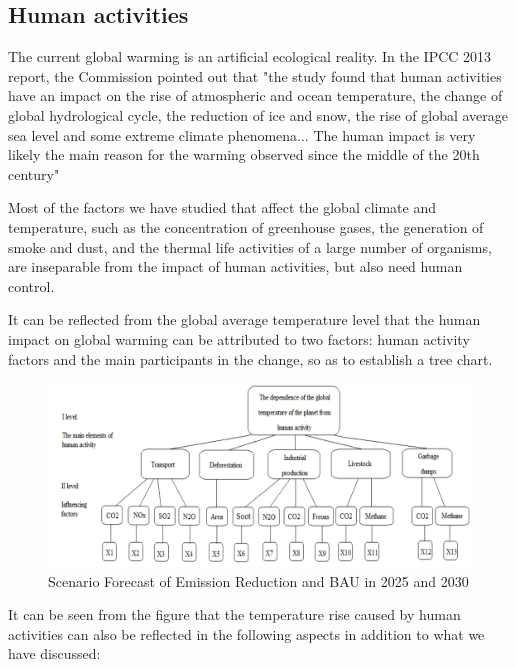 \documentclass{apmcmthesis}
\begin{document}
\subsection{Human activities}
The current global warming is an artificial ecological reality. In the IPCC 2013 report, the Commission pointed out that "the study found that human activities have an impact on the rise of atmospheric and ocean temperature, the change of global hydrological cycle, the reduction of ice and snow, the rise of global average sea level and some extreme climate phenomena... The human impact is very likely the main reason for the warming observed since the middle of the 20th century"\cite{109}

Most of the factors we have studied that affect the global climate and temperature, such as the concentration of greenhouse gases, the generation of smoke and dust, and the thermal life activities of a large number of organisms, are inseparable from the impact of human activities, but also need human control. 

It can be reflected from the global average temperature level that the human impact on global warming can be attributed to two factors: human activity factors and the main participants in the change, so as to establish a tree chart.

 \begin{figure} 
    \centering
    \includegraphics[width=13cm]{APMCMThesis/figures/tu3.png}
    \caption{Scenario Forecast of Emission Reduction and BAU in 2025 and 2030}
\label{relationship}
\end{figure}

It can be seen from the figure that the temperature rise caused by human activities can also be reflected in the following aspects in addition to what we have discussed:
\end{document}
